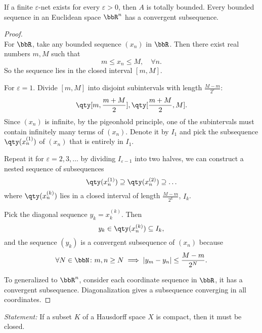 \documentclass[a4paper,12pt]{article}
\begin{document}
If a finite $\varepsilon$-net exists for every $\varepsilon>0$, then $A$ is totally bounded.
Every bounded sequence in an Euclidean space $\bbR^n$ has a convergent subsequence.

\begin{proof}\mbox{}\\
    For $\bbR$, take any bounded sequence $(x_n)$ in $\bbR$. Then there exist real numbers $m,M$ such that
    \[m\leq x_n\leq M,\quad\forall n.\]
    So the sequence lies in the closed interval $[m,M]$.

    For $\varepsilon=1$. Divide $[m,M]$ into disjoint subintervals with length $\frac{M-m}{2^\varepsilon}$:
    \[\qty[m,\frac{m+M}{2}],\qty[\frac{m+M}{2},M].\]
    Since $(x_n)$ is infinite, by the pigeonhold principle, one of the subintervals must contain infinitely many terms of $(x_n)$. Denote it by $I_1$ and pick the subsequence $\qty(x_n^{(1)})$ of $(x_n)$ that is entirely in $I_1$.

    Repeat it for $\varepsilon=2,3,\ldots$ by dividing $I_{\varepsilon-1}$ into two halves, we can construct a nested sequence of subsequences
    \[\qty(x_n^{(1)})\supseteq \qty(x_n^{(2)})\supseteq\ldots\]
    where $\qty(x_n^{(k)})$ lies in a closed interval of length $\frac{M-m}{2^k}$, $I_k$.

    Pick the diagonal sequence $y_k=x_k^(k)$. Then
    \[y_k\in\qty(x_n^{(k)})\subseteq I_k,\]
    and the sequence $(y_k)$ is a convergent subsequence of $(x_n)$ because
    \[\forall N\in\bbN\colon m,n\geq N\implies |y_m-y_n|\leq\frac{M-m}{2^N}.\]

    To generalized to $\bbR^n$, consider each coordinate sequence in $\bbR$, it has a convergent subsequence. Diagonalization gives a subsequence converging in all coordinates.
\end{proof}
\textit{Statement:} If a subset $K$ of a Hausdorff space $X$ is compact, then it must be closed.
\end{document}

